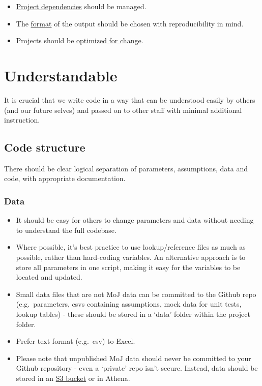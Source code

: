 \documentclass[]{book}
\providecommand{\tightlist}{%
  \setlength{\itemsep}{0pt}\setlength{\parskip}{0pt}}
\begin{document}
\begin{itemize}
\tightlist
\item
  \protect\hyperlink{projdep}{Project dependencies} should be managed.
\item
  The \protect\hyperlink{format}{format} of the output should be chosen with reproducibility in mind.
\item
  Projects should be \protect\hyperlink{change}{optimized for change}.
\end{itemize}

\hypertarget{understand}{%
\chapter{Understandable}\label{understand}}

It is crucial that we write code in a way that can be understood easily by others (and our future selves) and passed on to other staff with minimal additional instruction.

\hypertarget{structure2}{%
\section{Code structure}\label{structure2}}

There should be clear logical separation of parameters, assumptions, data and code, with appropriate documentation.

\hypertarget{data}{%
\subsection*{Data}\label{data}}

\begin{itemize}
\item
  It should be easy for others to change parameters and data without needing to understand the full codebase.
\item
  Where possible, it's best practice to use lookup/reference files as much as possible, rather than hard-coding variables. An alternative approach is to store all parameters in one script, making it easy for the variables to be located and updated.
\item
  Small data files that are not MoJ data can be committed to the Github repo (e.g.~parameters, csvs containing assumptions, mock data for unit tests, lookup tables) - these should be stored in a `data' folder within the project folder.
\item
  Prefer text format (e.g.~csv) to Excel.
\item
  Please note that unpublished MoJ data should never be committed to your Github repository - even a `private' repo isn't secure. Instead, data should be stored in an \href{https://user-guidance.services.alpha.mojanalytics.xyz/amazon-s3.html\#amazon-s3-2}{S3 bucket} or in Athena.
\end{itemize}
\end{document}
